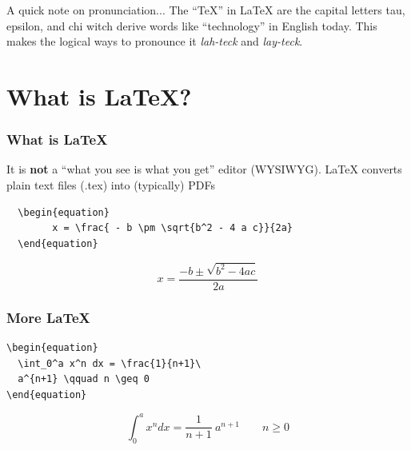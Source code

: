 \documentclass{beamer}
\newcommand{\latex}{\LaTeX\xspace}
\begin{document}
\begin{frame}{A quick note on pronunciation...}
  The ``TeX'' in \latex are the capital letters tau, epsilon, and chi witch derive words like ``technology'' in English today. This makes the logical ways to pronounce it \textit{lah-teck} and \textit{lay-teck}.
\end{frame}

\section{What is \latex?}

\begin{frame}[fragile]
  \frametitle{What is \latex}

  It is \textbf{not} a ``what you see is what you get'' editor (WYSIWYG). \latex converts plain text files (.tex) into (typically) PDFs

\begin{verbatim}
  \begin{equation}
        x = \frac{ - b \pm \sqrt{b^2 - 4 a c}}{2a}
  \end{equation}
\end{verbatim}
\par
  \hrulefill\par
  \begin{equation}
        x = \frac{ - b \pm \sqrt{b^2 - 4 a c}}{2a}
  \end{equation}

\end{frame}

\begin{frame}[fragile]
\frametitle{More \latex}
\begin{verbatim}
\begin{equation}
  \int_0^a x^n dx = \frac{1}{n+1}\
  a^{n+1} \qquad n \geq 0
\end{equation}
\end{verbatim}\par
  \hrulefill\par

\begin{equation}
  \int_0^a x^n dx = \frac{1}{n+1}\
  a^{n+1} \qquad n \geq 0
\end{equation}

\end{frame}
\end{document}

